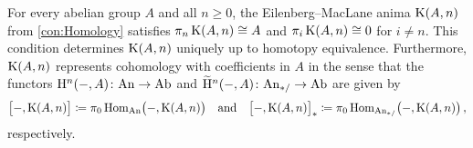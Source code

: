 \begin{thm}\label{thm:EilenbergMacLane}
	For every abelian group $A$ and all $n\geqslant 0$, the Eilenberg--MacLane anima $\operatorname{K}(A,n)$ from \cref{con:Homology} satisfies $\pi_n\operatorname{K}(A,n)\cong A$ and $\pi_i\operatorname{K}(A,n)\cong0$ for $i\neq n$. This condition determines $\operatorname{K}(A,n)$ uniquely up to homotopy equivalence. Furthermore, $\operatorname{K}(A,n)$ represents cohomology with coefficients in $A$  in the sense that the functors $\mathrm{H}^n(-,A)\colon \mathrm{An}\rightarrow \mathrm{Ab}$ and $\widetilde{\mathrm{H}}^n(-,A)\colon \mathrm{An}_{*/}\rightarrow \mathrm{Ab}$ are given by
	\begin{equation*}
		\bigl[-,\operatorname{K}(A,n)\bigr]\coloneqq\pi_0\operatorname{Hom}_{\mathrm{An}}\bigl(-,\operatorname{K}(A,n)\bigr)\quad\text{and}\quad \bigl[-,\operatorname{K}(A,n)\bigr]_*\coloneqq\pi_0\operatorname{Hom}_{\mathrm{An}_{*/}}\bigl(-,\operatorname{K}(A,n)\bigr)\,,
	\end{equation*}
	respectively.
\end{thm}
